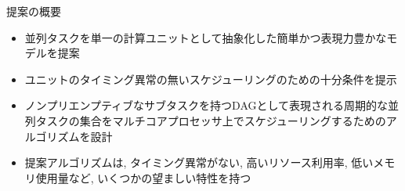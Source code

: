 
\begin{frame}{提案の概要}
    \begin{itemize}
        \item 並列タスクを単一の計算ユニットとして抽象化した簡単かつ表現力豊かなモデルを提案
        \item ユニットのタイミング異常の無いスケジューリングのための十分条件を提示
        \item ノンプリエンプティブなサブタスクを持つDAGとして表現される周期的な並列タスクの集合をマルチコアプロセッサ上でスケジューリングするためのアルゴリズムを設計
        \item 提案アルゴリズムは, タイミング異常がない, 高いリソース利用率, 低いメモリ使用量など, いくつかの望ましい特性を持つ
    \end{itemize}
\end{frame}
